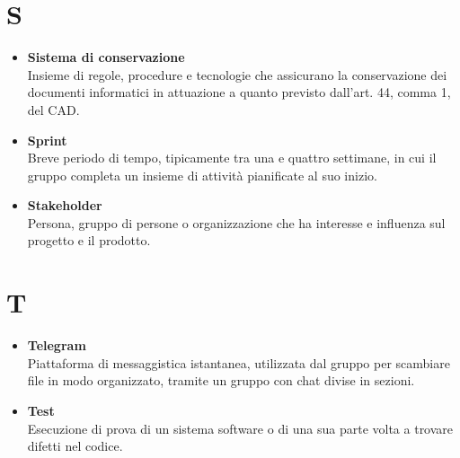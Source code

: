 \documentclass[a4paper,12pt]{article}
\begin{document}
        \section*{S} {
            \begin{itemize}
                \item \textbf{Sistema di conservazione}\\
                    Insieme di regole, procedure e tecnologie che assicurano la conservazione dei documenti informatici in attuazione a quanto previsto dall’art. 44, comma 1, del CAD.
                \item \textbf{Sprint}\\
                    Breve periodo di tempo, tipicamente tra una e quattro settimane, in cui il gruppo completa un insieme di attività pianificate al suo inizio.
                \item \textbf{Stakeholder}\\
                    Persona, gruppo di persone o organizzazione che ha interesse e influenza sul progetto e il prodotto.
            \end{itemize}
        }
        \newpage

        \section*{T} {
            \begin{itemize}
                \item \textbf{Telegram}\\
                    Piattaforma di messaggistica istantanea, utilizzata dal gruppo per scambiare file in modo organizzato, tramite un gruppo con chat divise in sezioni.
                \item \textbf{Test}\\
                    Esecuzione di prova di un sistema software o di una sua parte volta a trovare difetti nel codice.
            \end{itemize}
        }
        \newpage
\end{document}
